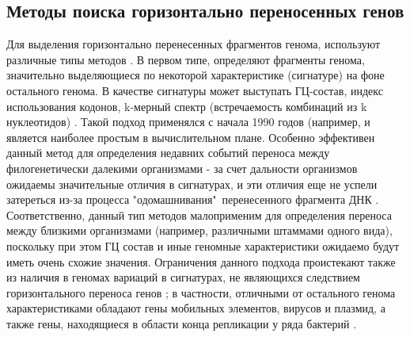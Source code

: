 \subsection{Методы поиска горизонтально переносенных генов}
Для выделения горизонтально перенесенных фрагментов генома, используют различные типы методов \cite{sevillya2020detecting}. В первом типе, определяют фрагменты генома, значительно выделяющиеся по некоторой характеристике (сигнатуре) на фоне остального генома. В качестве сигнатуры может выступать ГЦ-состав, индекс использования кодонов, k-мерный спектр (встречаемость комбинаций из k нуклеотидов) \cite{garcia2000horizontal}. Такой подход применялся с начала 1990 годов (например, \cite{medigue1991evidence} и является наиболее простым в вычислительном плане. Особенно эффективен данный метод для определения недавних событий переноса между филогенетически далекими организмами - за счет дальности организмов ожидаемы значительные отличия в сигнатурах, и эти отличия еще не успели затереться из-за процесса "одомашнивания"\ перенесенного фрагмента ДНК \cite{marri2008gene}. Соответственно, данный тип методов малоприменим для определения переноса между близкими организмами (например, различными штаммами одного вида), поскольку при этом ГЦ состав и иные геномные характеристики ожидаемо будут иметь очень схожие значения. Ограничения данного подхода проистекают также из наличия в геномах вариаций в сигнатурах, не являющихся следствием горизонтального переноса генов \cite{koski2001codon, gogarten2005horizontal}; в частности, отличными от остального генома характеристиками обладают гены мобильных элементов, вирусов и плазмид, а также гены, находящиеся в области конца репликации у ряда бактерий \cite{daubin2003source}. 

